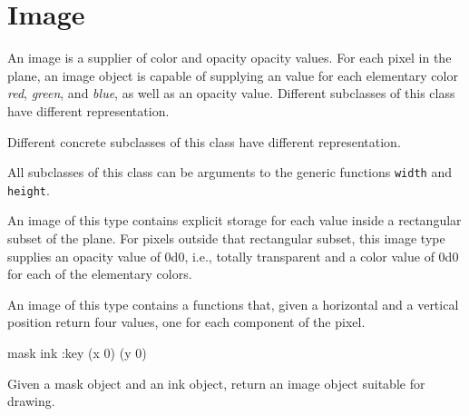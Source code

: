 \chapter{Image}
\label{chap-image}


An image is a supplier of color and opacity opacity values.  For each
pixel in the plane, an image object is capable of supplying an value
for each elementary color \emph{red}, \emph{green}, and \emph{blue},
as well as an opacity value.  Different subclasses of this class have
different representation.

Different concrete subclasses of this class have different
representation.

All subclasses of this class can be arguments to the generic functions
\texttt{width} and \texttt{height}.


An image of this type contains explicit storage for each value
inside a rectangular subset of the plane.  For pixels outside that
rectangular subset, this image type supplies an opacity value of 0d0,
i.e., totally transparent and a color value of 0d0 for each of the
elementary colors.


An image of this type contains a functions that, given a horizontal
and a vertical position return four values, one for each component of
the pixel.

 {mask ink :key (x 0) (y 0)}

Given a mask object and an ink object, return an image object suitable
for drawing.

